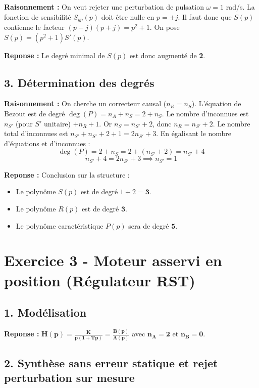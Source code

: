 \documentclass[11pt,a4paper]{article}
\begin{document}
\textbf{Raisonnement :} On veut rejeter une perturbation de pulsation $\omega = 1$ rad/s. La fonction de sensibilité $S_{yp}(p)$ doit être nulle en $p = \pm j$.
Il faut donc que $S(p)$ contienne le facteur $(p-j)(p+j) = p^2+1$.
On pose $S(p) = (p^2+1)S'(p)$.

\textbf{Reponse :} Le degré minimal de $S(p)$ est donc augmenté de \textbf{2}.

\subsection*{3. Détermination des degrés}

\textbf{Raisonnement :} On cherche un correcteur causal ($n_R = n_S$).
L'équation de Bezout est de degré $\deg(P) = n_A + n_S = 2 + n_S$.
Le nombre d'inconnues est $n_{S'}$ (pour $S'$ unitaire) $+ n_R + 1$.
Or $n_S = n_{S'} + 2$, donc $n_R = n_{S'} + 2$.
Le nombre total d'inconnues est $n_{S'} + n_{S'} + 2 + 1 = 2n_{S'} + 3$.
En égalisant le nombre d'équations et d'inconnues :
$$ \deg(P) = 2 + n_S = 2 + (n_{S'} + 2) = n_{S'} + 4 $$
$$ n_{S'} + 4 = 2n_{S'} + 3 \implies n_{S'} = 1 $$

\textbf{Reponse :} Conclusion sur la structure :
\begin{itemize}
    \item Le polynôme $S(p)$ est de degré $1 + 2 = \mathbf{3}$.
    \item Le polynôme $R(p)$ est de degré $\mathbf{3}$.
    \item Le polynôme caractéristique $P(p)$ sera de degré $\mathbf{5}$.
\end{itemize}

\hrulefill

\section*{Exercice 3 - Moteur asservi en position (Régulateur RST)}

\subsection*{1. Modélisation}

\textbf{Reponse :} $\mathbf{H(p) = \frac{K}{p(1+Tp)} = \frac{B(p)}{A(p)}}$ avec $\mathbf{n_A = 2}$ et $\mathbf{n_B = 0}$.

\subsection*{2. Synthèse sans erreur statique et rejet perturbation sur mesure}
\end{document}
